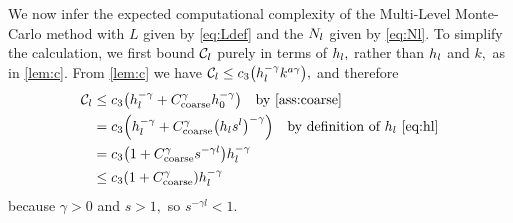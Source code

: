 We now infer the expected computational complexity of the Multi-Level Monte-Carlo meth\-od with $L$ given by \eqref{eq:Ldef} and the $N_{l}$ given by \eqref{eq:Nl}. To simplify the calculation, we first bound $\mathcal C_{l}$ purely in terms of $h_{l},$ rather than $h_{l}$ and $k,$ as in \cref{lem:c}. From \cref{lem:c} we have $\Cl \leq \cth \mleft(\hl^{-\gamma} k^{a\gamma}\mright),$ and therefore
\begin{align*}
  \Cl &\leq \cth \mleft(\hl^{-\gamma} + \Ccoarse^{\gamma} \hz^{-\gamma}\mright) \quad\text{by \cref{ass:coarse}}\\
  &= \cth \mleft(\hl^{-\gamma} + \Ccoarse^{\gamma} \mleft(\hl s^l\mright)^{-\gamma}\mright) \quad\text{by definition of } \hl \text{ \cref{eq:hl}}\\
  &= \cth\mleft(1+\Ccoarse^{\gamma}s^{-\gamma l}\mright)\hl^{-\gamma}\\
  &\leq \cth \mleft(1+\Ccoarse^{\gamma}\mright)\hl^{-\gamma}
\end{align*}
because $\gamma > 0$ and $s>1,$ so $s^{-\gamma l} < 1.$

